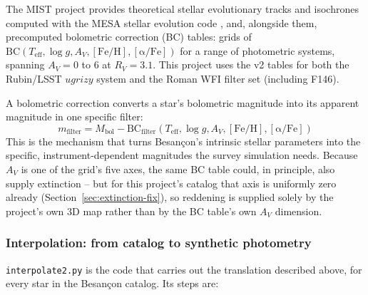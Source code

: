 \documentclass[english,10pt,a4paper]{article}
\begin{document}
	The MIST project provides theoretical stellar evolutionary tracks and isochrones computed with the MESA stellar evolution code \cite{Choi2016MIST}, and, alongside them, precomputed bolometric correction (BC) tables: grids of $\mathrm{BC}(T_{\mathrm{eff}}, \log g, A_V, \mathrm{[Fe/H]}, \mathrm{[\alpha/Fe]})$ for a range of photometric systems, spanning $A_V=0$ to $6$ at $R_V=3.1$. This project uses the v2 tables for both the Rubin/LSST $ugrizy$ system and the Roman WFI filter set (including F146).
	
	A bolometric correction converts a star's bolometric magnitude into its apparent magnitude in one specific filter:
	\[
	m_{\mathrm{filter}} = M_{\mathrm{bol}} - \mathrm{BC}_{\mathrm{filter}}(T_{\mathrm{eff}}, \log g, A_V, \mathrm{[Fe/H]}, \mathrm{[\alpha/Fe]})
	\]
	This is the mechanism that turns Besan\c{c}on's intrinsic stellar parameters into the specific, instrument-dependent magnitudes the survey simulation needs. Because $A_V$ is one of the grid's five axes, the same BC table could, in principle, also supply extinction -- but for this project's catalog that axis is uniformly zero already (Section~\ref{sec:extinction-fix}), so reddening is supplied solely by the project's own 3D map rather than by the BC table's own $A_V$ dimension.
	
	\subsubsection{Interpolation: from catalog to synthetic photometry}
	\label{subsec:interpolation}
	
	\texttt{interpolate2.py} is the code that carries out the translation described above, for every star in the Besan\c{c}on catalog. Its steps are:
	
\end{document}
